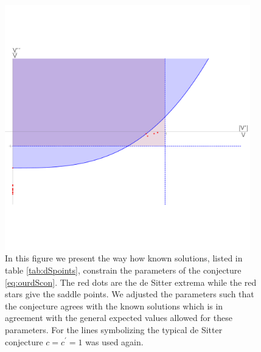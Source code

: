 \documentclass[a4paper,12pt,twoside,openright]{report}
\begin{document}
\begin{figure}[htb]
     \centering
     \includegraphics[trim=0 210 0 170,clip,width=0.95\textwidth]{constpara_mod.pdf}
     \caption{In this figure we present the way how known solutions, listed in table \ref{tab:dSpoints}, constrain the parameters of the conjecture \eqref{eq:ourdScon}. The red dots are the de Sitter extrema while the red stars give the saddle points. We adjusted the parameters such that the conjecture agrees with the known solutions which is in agreement with the general expected values allowed for these parameters. For the lines symbolizing the typical de Sitter conjecture $c=c^ \prime = 1$ was used again.}
     \label{fig:constconj}
\end{figure}
\newpage
\end{document}
